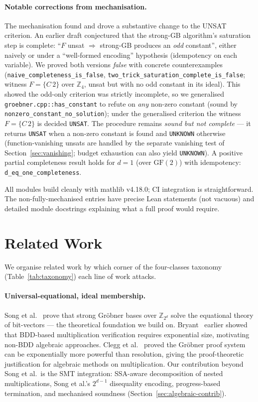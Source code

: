 \documentclass[runningheads]{llncs}
\begin{document}
\paragraph{Notable corrections from mechanisation.} The
mechanisation found and drove a substantive change to the UNSAT
criterion. An earlier draft conjectured that the strong-GB
algorithm's saturation step is complete: ``$F$ unsat $\Rightarrow$
strong-GB produces an \emph{odd} constant'', either naively or
under a ``well-formed encoding'' hypothesis (idempotency on each
variable). We proved both versions \emph{false} with concrete
counterexamples (\texttt{naive\_completeness\_is\_false},
\texttt{two\_trick\_saturation\_complete\_is\_false}; witness
$F=\{C\,2\}$ over $\mathbb{Z}_4$, unsat but with no odd constant
in its ideal). This showed the odd-only criterion was strictly
incomplete, so we generalised \texttt{groebner.cpp::has\_constant}
to refute on \emph{any} non-zero constant (sound by
\texttt{nonzero\_constant\_no\_solution}); under the generalised
criterion the witness $F=\{C\,2\}$ is decided \texttt{UNSAT}. The
procedure remains \emph{sound but not complete} --- it returns
\texttt{UNSAT} when a non-zero constant is found and
\texttt{UNKNOWN} otherwise (function-vanishing unsats are handled
by the separate vanishing test of Section~\ref{sec:vanishing};
budget exhaustion can also yield \texttt{UNKNOWN}). A positive
partial completeness result holds for $d=1$ (over $\mathrm{GF}(2)$)
with idempotency: \texttt{d\_eq\_one\_completeness}.

All modules build cleanly with mathlib v4.18.0; CI integration is
straightforward. The non-fully-mechanised entries have precise
Lean statements (not vacuous) and detailed module docstrings
explaining what a full proof would require.


\section{Related Work}

We organise related work by which corner of the four-classes
taxonomy (Table~\ref{tab:taxonomy}) each line of work attacks.

\paragraph{Universal-equational, ideal membership.}
Song et al.~\cite{song2024equational} prove that strong Gr\"obner
bases over $\mathbb{Z}_{2^d}$ solve the equational theory of
bit-vectors --- the theoretical foundation we build on.
Bryant~\cite{bryant1991complexity} earlier showed that BDD-based
multiplication verification requires exponential size, motivating
non-BDD algebraic approaches. Clegg
et al.~\cite{clegg1996groebner} proved the Gr\"obner proof system
can be exponentially more powerful than resolution, giving the
proof-theoretic justification for algebraic methods on
multiplication. Our contribution beyond Song et al.\ is the SMT
integration: SSA-aware decomposition of nested multiplications,
Song et al.'s $2^{d-1}$ disequality encoding, progress-based
termination, and mechanised soundness
(Section~\ref{sec:algebraic-contrib}).
\end{document}
